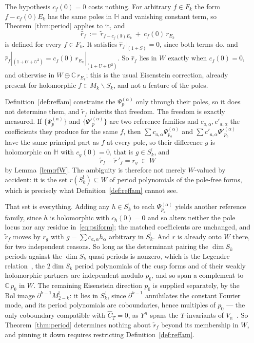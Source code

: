 \documentclass[11pt]{article}
\newcommand{\HH}{\mathbb{H}}
\newcommand{\CC}{\mathbb{C}}
\begin{document}
The hypothesis $c_f(0)=0$ costs nothing. For arbitrary $f\in F_k$ the form $f-c_f(0)E_k$ has the
same poles in $\HH$ and vanishing constant term, so Theorem~\ref{thm:period} applies to it, and
\begin{equation}\label{eq:rhat}
\hat r_f\ :=\ \tilde r_{f-c_f(0)E_k}\ +\ c_f(0)\,r_{E_k}
\end{equation}
is defined for every $f\in F_k$. It satisfies $\hat r_f|_{(1+S)}=0$, since both terms do, and
$\hat r_f|_{(1+U+U^2)}=c_f(0)\,r_{E_k}|_{(1+U+U^2)}$. So $\hat r_f$ lies in $W$ exactly when
$c_f(0)=0$, and otherwise in $W\oplus\CC\,r_{E_k}$; this is the usual Eisenstein correction, already
present for holomorphic $f\in M_k\smallsetminus S_k$, and not a feature of the poles.

Definition~\ref{def:reffam} constrains the $\Psi^{(\alpha)}_p$ only through their poles, so it does
not determine them, and $\tilde r_f$ inherits that freedom. The freedom is exactly measured. If
$\{\Psi^{(\alpha)}_p\}$ and $\{\Psi'^{(\alpha)}_p\}$ are two reference families and
$c_{a,\alpha},c'_{a,\alpha}$ the coefficients they produce for the same $f$, then
$\sum c_{a,\alpha}\Psi^{(\alpha)}_{p_a}$ and $\sum c'_{a,\alpha}\Psi'^{(\alpha)}_{p_a}$ have the
same principal part as $f$ at every pole, so their difference $g$ is holomorphic on $\HH$ with
$c_g(0)=0$, that is $g\in S^!_k$, and
\begin{equation}\label{eq:ambig}
\tilde r_f-\tilde r\,'_f=r_g\ \in\ W
\end{equation}
by Lemma~\ref{lem:rfW}. The ambiguity is therefore not merely $W$-valued by accident: it is the set
$r(S^!_k)\subseteq W$ of period polynomials of the pole-free forms, which is precisely what
Definition~\ref{def:reffam} cannot see.

That set is everything. Adding any $h\in S^!_k$ to each $\Psi^{(\alpha)}_{p_a}$ yields another
reference family, since $h$ is holomorphic with $c_h(0)=0$ and so alters neither the pole locus nor
any residue in~\eqref{eq:psiform}; the matched coefficients are unchanged, and $\tilde r_f$ moves by
$r_g$ with $g=\sum c_{a,\alpha}h_\alpha$ arbitrary in $S^!_k$. And $r$ is already onto $W$ there,
for two independent reasons. So long as the determinant pairing the $\dim S_k$ periods against the
$\dim S_k$ quasi-periods is nonzero, which is the Legendre relation~\cite{BrownHain2018}, the
$2\dim S_k$ period polynomials of the cusp forms and of their weakly holomorphic partners are
independent modulo $p_0$, and so span a complement to $\CC\,p_0$ in $W$. The remaining Eisenstein
direction $p_0$ is supplied separately, by the Bol image $\partial^{k-1}M^!_{2-k}$: it lies in
$S^!_k$, since $\partial^{k-1}$ annihilates the constant Fourier mode, and its period polynomials
are coboundaries, hence multiples of $p_0$ — the only coboundary compatible with $\hat C_T=0$,
as $Y^n$ spans the $T$-invariants of $V_n$~\cite{VerifyScripts}. So Theorem~\ref{thm:period}
determines nothing about $\tilde r_f$ beyond its membership in $W$, and pinning it down requires
restricting Definition~\ref{def:reffam}.
\end{document}
